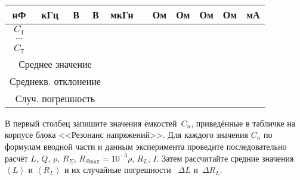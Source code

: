 \begin{lab:task}
\begin{tabular}{|c|c|c|c|c|c|c|c|c|c|c|}
		                    нФ & кГц & В & В & мкГн &  & Ом & Ом & Ом & Ом & мА
\\
		                    \hline
		                    $C_1$ & & & & & & & & & & \\
		                    \hline
		                    $\cdots$ &  & & &  &  &  &  & & & \\
		                    \hline
		                    $C_7$& & & & & & & & & & \\
		                    \hline
		                    \multicolumn{4}{|c|}{Среднее значение} & & & & & & & \\
		                    \hline
		                    \multicolumn{4}{|c|}{Среднекв. отклонение} & & & & & & & \\ \hline
%
		                    \multicolumn{4}{|c|}{Случ. погрешность} & & & & & & & \\ \hline
		                \end{tabular}
\endgroup%

В первый столбец запишите значения ёмкостей~$C_n$,
приведённые в табличке на корпусе блока <<Резонанс напряжений>>. Для каждого
значения $C_n$ по формулам вводной части и данным эксперимента проведите
последовательно расчёт $L$, $Q$, $\rho$, $R_{\Sigma}$,
$R_{S\text{max}}=10^{-3}\rho$, $R_L$, $I$. Затем рассчитайте
средние значения $\left< L \right>$ и $\left< R_L \right>$ 
и их случайные погрешности ~$\Delta L$ и~$\Delta R_L$.



\end{lab:task}
